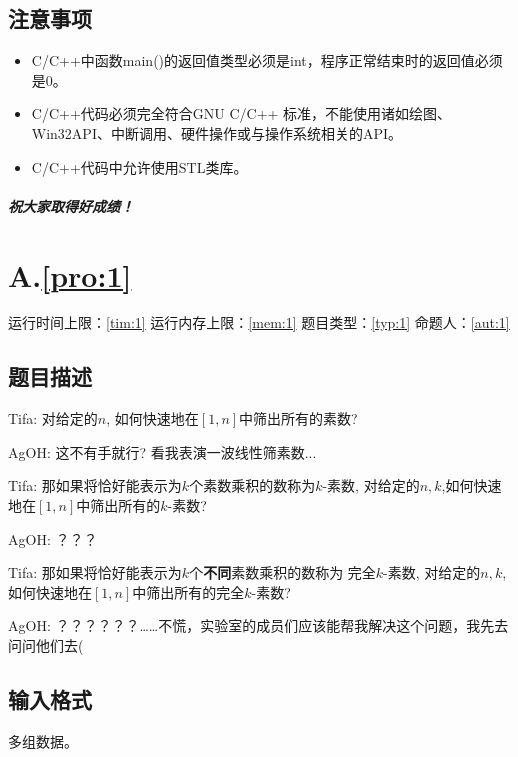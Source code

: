 \documentclass[
	lang=cn,
	color=green
]{elegantbook}
\begin{document}
\begin{titlepage}
    \section*{注意事项}
    \begin{itemize}
        \item C/C++中函数main()的返回值类型必须是int，程序正常结束时的返回值必须是0。
        \item C/C++代码必须完全符合GNU C/C++ 标准，不能使用诸如绘图、Win32API、中断调用、硬件操作或与操作系统相关的API。
        \item C/C++代码中允许使用STL类库。
    \end{itemize}

    \paragraph*{祝大家取得好成绩！}

\end{titlepage}

\chapter*{A.\quad \ref*{pro:1}}
\begin{center}
    运行时间上限：\ref*{tim:1} \quad 运行内存上限：\ref*{mem:1} \quad 题目类型：\ref*{typ:1} \quad 命题人：\ref*{aut:1}
\end{center}

\section*{题目描述}
Tifa: 对给定的$n$, 如何快速地在$[1,n]$中筛出所有的素数?

AgOH: 这不有手就行? 看我表演一波线性筛素数...

Tifa: 那如果将恰好能表示为$k$个素数乘积的数称为$k$-素数, 对给定的$n,k$,如何快速地在$[1,n]$中筛出所有的$k$-素数?

AgOH: ？？？

Tifa: 那如果将恰好能表示为$k$个\textbf{不同}素数乘积的数称为 完全$k$-素数, 对给定的$n,k$,如何快速地在$[1,n]$中筛出所有的完全$k$-素数?

AgOH: ？？？？？？……不慌，实验室的成员们应该能帮我解决这个问题，我先去问问他们去(

\section*{输入格式}
多组数据。
\end{document}
